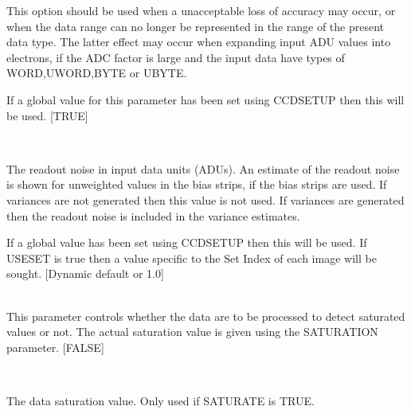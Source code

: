 \documentclass[twoside,11pt]{article}
\newcommand{\htmlref}[2]{#1}
\renewcommand{\_}{\texttt{\symbol{95}}}
\newcommand{\routine}[1]{{\sc #1}}
\newcommand{\xroutine}[1]{\htmlref{{\sc #1}}{#1}}
\newcommand{\sstsubsection}[1]{ \item[{#1}] \mbox{} \\}
\newcommand{\sstsubsection}[1]{\item[{#1}]}
\begin{document}
{{{         This option should be used when a unacceptable loss of
         accuracy may occur, or when the data range can no longer be
         represented in the range of the present data type. The latter
         effect may occur when expanding input ADU values into
         electrons, if the ADC factor is large and the input data have
         types of \_WORD,\_UWORD,\_BYTE or \_UBYTE.

         If a global value for this parameter has been set using
         \xroutine{CCDSETUP} then this will be used.
         [TRUE]
      }
      \sstsubsection{
         RNOISE = \_DOUBLE (Read)
      } {
         The readout noise in input data units (ADUs). An estimate of
         the readout noise is shown for unweighted values in the bias
         strips, if the bias strips are used. If variances are not
         generated then this value is not used. If variances are
         generated then the readout noise is included in the variance
         estimates.

         If a global value has been set using \routine{CCDSETUP} then this will
         be used.  If USESET is true then a value specific to the
         Set Index of each image will be sought.
         [Dynamic default or 1.0]
      }
      \sstsubsection{
         SATURATE = \_LOGICAL (Read)
      } {
         This parameter controls whether the data are to be processed to
         detect saturated values or not. The actual saturation value is
         given using the SATURATION parameter.
         [FALSE]
      }
      \sstsubsection{
         SATURATION = \_DOUBLE (Read)
      } {
         The data saturation value. Only used if SATURATE is TRUE.

}}}
\end{document}
